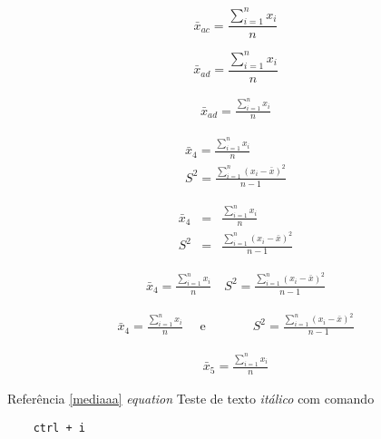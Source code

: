 \documentclass[a4paper, 11pt]{book}  %
\begin{document}
\begin{equation}
    \bar{x}_{ac} = \frac{\displaystyle \sum_{i=1}^{n}{x_{i}}}{n}
    \label{media4}
\end{equation}


\begin{equation}
    \bar{x}_{ad} = \frac{\displaystyle \sum_{i=1}^{n}{x_{i}}}{n} \nonumber
\end{equation}

\begin{eqnarray}
    \bar{x}_{ad} = \frac{\displaystyle \sum_{i=1}^{n}{x_{i}}}{n} \nonumber
\end{eqnarray}

\begin{eqnarray}
    \bar{x}_{4} = \frac{\sum_{i=1}^{n}{x_{i}}}{n} \nonumber \\ 
    S^2 = \frac{\sum_{i=1}^{n}{(x_{i} - \bar{x})^2}}{n-1} \nonumber
\end{eqnarray}

\begin{eqnarray}
    \bar{x}_{4} &=& \frac{\sum_{i=1}^{n}{x_{i}}}{n} \nonumber \\ 
    S^2 &=& \frac{\sum_{i=1}^{n}{(x_{i} - \bar{x})^2}}{n-1} \nonumber
\end{eqnarray}

\begin{eqnarray}
    \bar{x}_{4} = \frac{\sum_{i=1}^{n}{x_{i}}}{n}
    \quad       %
    S^2 = \frac{\sum_{i=1}^{n}{(x_{i} - \bar{x})^2}}{n-1} \nonumber
\end{eqnarray}


\begin{eqnarray}
    \bar{x}_{4} = \frac{\sum_{i=1}^{n}{x_{i}}}{n}
    \quad \textrm{ e }\hspace{1cm}
    \quad S^2 = \frac{\sum_{i=1}^{n}{(x_{i} - \bar{x})^2}}{n-1} \nonumber
    \label{media4}  %
\end{eqnarray}
    
\begin{eqnarray}
    \bar{x}_{5} = \frac{\displaystyle \sum_{i=1}^{n}{x_{i}}}{n}
    \label{media5}
\end{eqnarray}

Referência \ref{mediaaa}
\textit{equation}
Teste de texto \textit{itálico} com comando
\begin{verbatim}
    ctrl + i
\end{verbatim}
\end{document}
